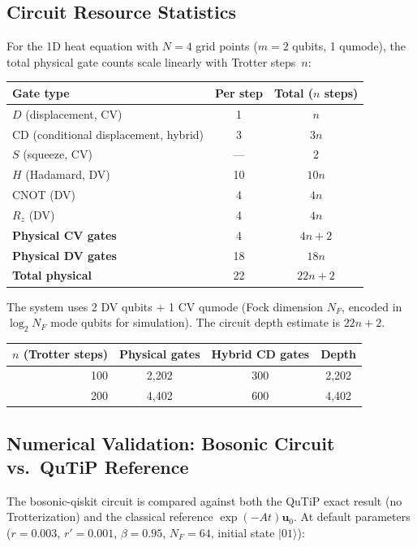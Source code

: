 \documentclass[11pt]{article}
\begin{document}
\subsection{Circuit Resource Statistics}

For the 1D heat equation with $N=4$ grid points ($m=2$ qubits, 1 qumode),
the total physical gate counts scale linearly with Trotter steps~$n$:

\begin{center}
\begin{tabular}{lcc}
  \toprule
  Gate type & Per step & Total ($n$ steps) \\
  \midrule
  $D$ (displacement, CV) & 1 & $n$ \\
  CD (conditional displacement, hybrid) & 3 & $3n$ \\
  $S$ (squeeze, CV) & --- & 2 \\
  $H$ (Hadamard, DV) & 10 & $10n$ \\
  CNOT (DV) & 4 & $4n$ \\
  $R_z$ (DV) & 4 & $4n$ \\
  \midrule
  \textbf{Physical CV gates} & 4 & $4n + 2$ \\
  \textbf{Physical DV gates} & 18 & $18n$ \\
  \textbf{Total physical} & 22 & $22n + 2$ \\
  \bottomrule
\end{tabular}
\end{center}

\noindent
The system uses 2 DV qubits + 1 CV qumode (Fock dimension $N_F$,
encoded in $\log_2 N_F$ mode qubits for simulation).
The circuit depth estimate is $22n + 2$.

\begin{center}
\begin{tabular}{rccc}
  \toprule
  $n$ (Trotter steps) & Physical gates & Hybrid CD gates & Depth \\
  \midrule
  100 & 2{,}202 & 300 & 2{,}202 \\
  200 & 4{,}402 & 600 & 4{,}402 \\
  \bottomrule
\end{tabular}
\end{center}

\subsection{Numerical Validation: Bosonic Circuit vs.\ QuTiP Reference}

The bosonic-qiskit circuit is compared against both the QuTiP exact result
(no Trotterization) and the classical reference $\exp(-At)\mathbf{u}_0$.
At default parameters ($r=0.003$, $r'=0.001$, $\beta=0.95$, $N_F=64$,
initial state $|01\rangle$):
\end{document}
